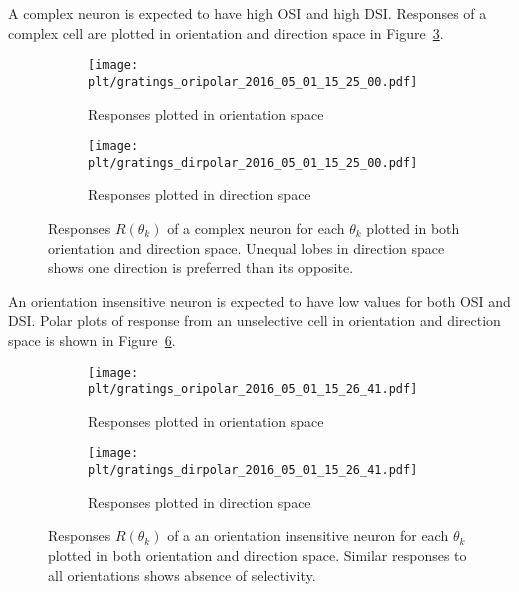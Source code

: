 \documentclass[MTech]{iitmdiss}
\newcommand{\plt}{thesis_plots}
\begin{document}
A complex neuron is expected to have high OSI and high DSI. Responses of a complex cell are plotted in orientation and direction space in Figure~\ref{fig:oridir_complex}.
\begin{figure}[h]
  \begin{subfigure}[b]{0.5\textwidth}
    \texttt{[image: \\plt/gratings\_oripolar\_2016\_05\_01\_15\_25\_00.pdf]}
    \caption{Responses plotted in orientation space}
    \label{fig:ori_complex}
  \end{subfigure}%
  \begin{subfigure}[b]{0.5\textwidth}
    \texttt{[image: \\plt/gratings\_dirpolar\_2016\_05\_01\_15\_25\_00.pdf]}
    \caption{Responses plotted in direction space}
    \label{fig:dir_complex}
  \end{subfigure}%
  \caption{Responses $R(\theta_k)$ of a complex neuron for each $\theta_k$ plotted in both orientation and direction space. Unequal lobes in direction space shows one direction is preferred than its opposite.}\label{fig:oridir_complex}
\end{figure}

An orientation insensitive neuron is expected to have low values for both OSI and DSI. Polar plots of response from an unselective cell in orientation and direction space is shown in Figure~\ref{fig:oridir_unsel}.
\begin{figure}[h]
  \begin{subfigure}[b]{0.5\textwidth}
    \texttt{[image: \\plt/gratings\_oripolar\_2016\_05\_01\_15\_26\_41.pdf]}
    \caption{Responses plotted in orientation space}
    \label{fig:ori_unsel}
  \end{subfigure}%
  \begin{subfigure}[b]{0.5\textwidth}
    \texttt{[image: \\plt/gratings\_dirpolar\_2016\_05\_01\_15\_26\_41.pdf]}
    \caption{Responses plotted in direction space}
    \label{fig:dir_unsel}
  \end{subfigure}%
  \caption{Responses $R(\theta_k)$ of a an orientation insensitive neuron for each $\theta_k$ plotted in both orientation and direction space. Similar responses to all orientations shows absence of selectivity.}\label{fig:oridir_unsel}
\end{figure}
\end{document}
